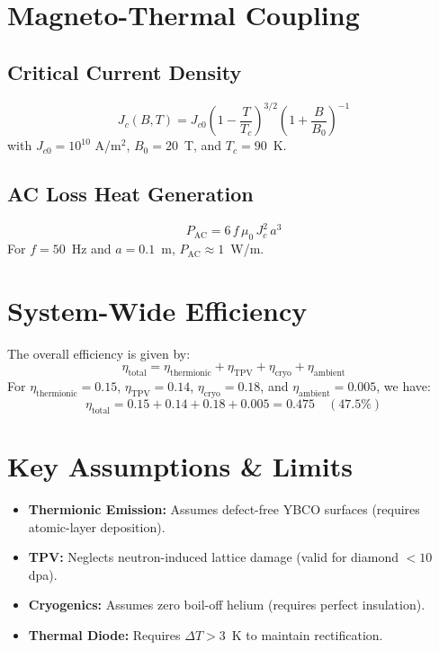 \documentclass[12pt]{article}
\begin{document}
\section{Magneto-Thermal Coupling}
\subsection{Critical Current Density}
\begin{equation}
    J_c(B,T) = J_{c0}\left(1 - \frac{T}{T_c}\right)^{3/2}\left(1 + \frac{B}{B_0}\right)^{-1}
\end{equation}
with $J_{c0} = 10^{10}$ A/m$^2$, $B_0 = 20$~T, and $T_c = 90$~K.

\subsection{AC Loss Heat Generation}
\begin{equation}
    P_{\text{AC}} = 6\,f\,\mu_0\,J_c^2\,a^3
\end{equation}
For $f = 50$~Hz and $a = 0.1$~m, $P_{\text{AC}} \approx 1$~W/m.

\section{System-Wide Efficiency}
The overall efficiency is given by:
\begin{equation}
    \eta_{\text{total}} = \eta_{\text{thermionic}} + \eta_{\text{TPV}} + \eta_{\text{cryo}} + \eta_{\text{ambient}}
\end{equation}
For $\eta_{\text{thermionic}} = 0.15$, $\eta_{\text{TPV}} = 0.14$, $\eta_{\text{cryo}} = 0.18$, and $\eta_{\text{ambient}} = 0.005$, we have:
\[
\eta_{\text{total}} = 0.15 + 0.14 + 0.18 + 0.005 = 0.475 \quad (47.5\%)
\]

\section{Key Assumptions \& Limits}
\begin{itemize}
    \item \textbf{Thermionic Emission:} Assumes defect-free YBCO surfaces (requires atomic-layer deposition).
    \item \textbf{TPV:} Neglects neutron-induced lattice damage (valid for diamond $<10$ dpa).
    \item \textbf{Cryogenics:} Assumes zero boil-off helium (requires perfect insulation).
    \item \textbf{Thermal Diode:} Requires $\Delta T > 3$~K to maintain rectification.
\end{itemize}
\end{document}
